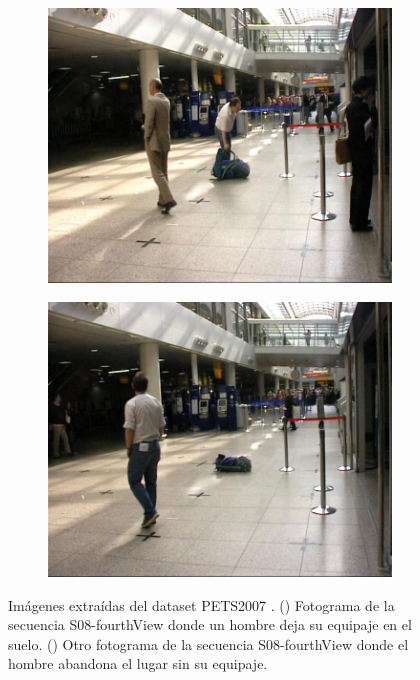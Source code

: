 \begin{figure}[ht]
  \centering
  \begin{subfigure}[b]{0.4\textwidth}
    \includegraphics[width=\textwidth]{img/chapters/resultados/datasets/pets2007_1.jpg}
    \caption{}
    \label{fig:pets2007_1}
  \end{subfigure}
  \qquad\qquad
  \begin{subfigure}[b]{0.4\textwidth}
    \includegraphics[width=\textwidth]{img/chapters/resultados/datasets/pets2007_2.jpg}
    \caption{}
    \label{fig:pets2007_2}
  \end{subfigure}
  \caption{Imágenes extraídas del dataset PETS2007 \cite{pets2007-dataset}.
    (\protect{}) Fotograma de la secuencia S08-fourthView donde un hombre deja su equipaje en el suelo.
    (\protect{}) Otro fotograma de la secuencia S08-fourthView donde el hombre abandona el lugar sin su equipaje.}
  \label{fig:pets2007_S08}
\end{figure}

